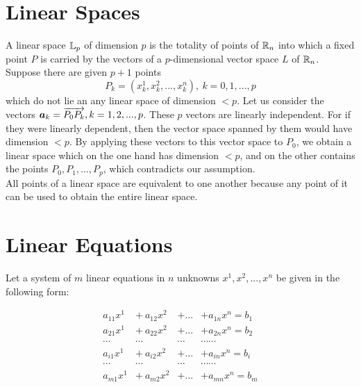 \section{Linear Spaces}

A linear space $\mathbb{L}_p$ of dimension $p$ is the totality of points of $\mathbb{R}_n$ into which a fixed point $P$ is carried by the vectors of a $p$-dimensional vector space $L$ of $\mathbb{R}_n$. Suppose there are given $p+1$ points 
$$P_k = (x^1_k, x^2_k,...,x^n_k), ~k = 0, 1, ..., p$$ which do not lie an any linear space of dimension $<p$. Let us consider the vectors $\boldsymbol{a}_k = \overrightarrow{P_0 P_k}, k = 1, 2, ...,p$. These $p$ vectors are linearly independent.
For if they were linearly dependent, then the vector space spanned by them would have dimension $<p$. By applying these vectors to this vector space to $P_0$, we obtain a linear space which on the one hand has dimension $<p$, and on
the other contains the points $P_0, P_1, ..., P_p$, which contradicts our assumption.\\

All points of a linear space are equivalent to one another because any point of it can be used to obtain the entire linear space. 

\section{Linear Equations}

Let a system of $m$ linear equations in $n$ unknowns $x^1, x^2, ..., x^n$ be given in the following form:


\begin{equation}
\begin{array}{cccc}
a_{11}x^1  &+ ~a_{12}x^2   & + \hdots  &+  a_{1n}x^n   = b_1 \\
a_{21}x^1  &+ ~ a_{22}x^2   &+ \hdots  &+  a_{2n}x^n   = b_2 \\
 \cdots       &\cdots            &\cdots      &\cdots                \cdots \\
a_{i1}x^1   &+  ~a_{i2}x^2    & + \hdots  &+  a_{in}x^n    = b_i \\
 \cdots       &\cdots            &\cdots      &\cdots                 \cdots\\
a_{m1}x^1 &+  ~a_{m2}x^2 & + \hdots  & +  a_{mn}x^n = b_m \\
\end{array}
\label{LinearSystem}
\end{equation}

